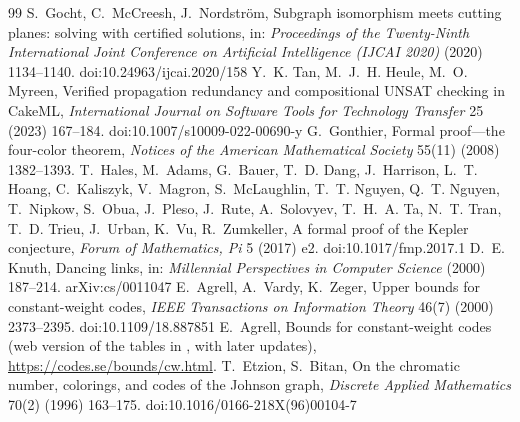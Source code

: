 \documentclass[11pt]{article}
\theoremstyle{plain}
\begin{document}
\begin{thebibliography}{99}
 S.~Gocht, C.~McCreesh, J.~Nordstr\"om, Subgraph isomorphism meets cutting planes: solving with certified solutions, in: \emph{Proceedings of the Twenty-Ninth International Joint Conference on Artificial Intelligence (IJCAI 2020)} (2020) 1134--1140. doi:10.24963/ijcai.2020/158
 Y.~K. Tan, M.~J.~H. Heule, M.~O. Myreen, Verified propagation redundancy and compositional UNSAT checking in CakeML, \emph{International Journal on Software Tools for Technology Transfer} 25 (2023) 167--184. doi:10.1007/s10009-022-00690-y
 G.~Gonthier, Formal proof---the four-color theorem, \emph{Notices of the American Mathematical Society} 55(11) (2008) 1382--1393.
 T.~Hales, M.~Adams, G.~Bauer, T.~D. Dang, J.~Harrison, L.~T. Hoang, C.~Kaliszyk, V.~Magron, S.~McLaughlin, T.~T. Nguyen, Q.~T. Nguyen, T.~Nipkow, S.~Obua, J.~Pleso, J.~Rute, A.~Solovyev, T.~H.~A. Ta, N.~T. Tran, T.~D. Trieu, J.~Urban, K.~Vu, R.~Zumkeller, A formal proof of the Kepler conjecture, \emph{Forum of Mathematics, Pi} 5 (2017) e2. doi:10.1017/fmp.2017.1
 D.~E. Knuth, Dancing links, in: \emph{Millennial Perspectives in Computer Science} (2000) 187--214. arXiv:cs/0011047
 E.~Agrell, A.~Vardy, K.~Zeger, Upper bounds for constant-weight codes, \emph{IEEE Transactions on Information Theory} 46(7) (2000) 2373--2395. doi:10.1109/18.887851
 E.~Agrell, Bounds for constant-weight codes (web version of the tables in \cite{AVZ}, with later updates), \url{https://codes.se/bounds/cw.html}.
 T.~Etzion, S.~Bitan, On the chromatic number, colorings, and codes of the Johnson graph, \emph{Discrete Applied Mathematics} 70(2) (1996) 163--175. doi:10.1016/0166-218X(96)00104-7
\end{thebibliography}
\endgroup
\end{document}
